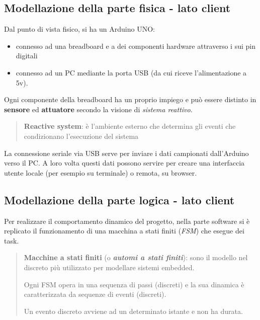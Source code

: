 \subsection{Modellazione della parte fisica - lato client}
Dal punto di vista fisico, si ha un Arduino UNO:
\begin{itemize}
	\item connesso ad una breadboard e a dei componenti hardware attraverso i sui pin digitali
	\item connesso ad un PC mediante la porta USB (da cui riceve l'alimentazione a 5v). 
\end{itemize}
Ogni componente della breadboard ha un proprio impiego e può essere distinto in \textbf{sensore} ed \textbf{attuatore} secondo la visione di \textit{sistema reattivo}.
	\begin{quote}
		\textbf{Reactive system}: è l’ambiente esterno che determina gli eventi che	condizionano l’esecuzione del sistema
	\end{quote}	
La connessione seriale via USB serve per inviare i dati campionati dall'Arduino verso il PC. A loro volta questi dati possono servire per creare una interfaccia utente locale (per esempio su terminale) o remota, su browser.

\subsection{Modellazione della parte logica - lato client}
Per realizzare il comportamento dinamico del progetto, nella parte software si è replicato il funzionamento di una macchina a stati finiti (\textit{FSM}) che esegue dei task.

	\begin{quote}
		\textbf{Macchine a stati finiti} (o \textbf{\textit{automi a stati finiti}}): sono il modello nel discreto più utilizzato per modellare sistemi embedded.
		
		Ogni FSM opera in una sequenza di passi (discreti) e la sua dinamica è caratterizzata da sequenze di eventi (discreti).
		
		Un evento discreto avviene ad un determinato istante e non ha durata.
	\end{quote}
	
